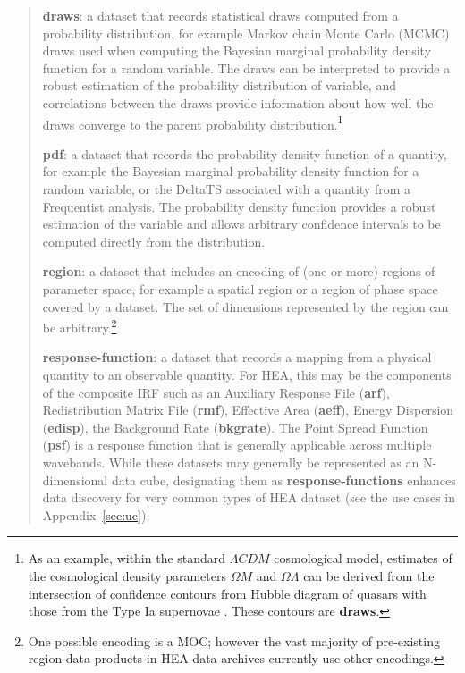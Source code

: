 \documentclass[11pt,a4paper]{ivoa}
\begin{document}
\begin{quote}
{\bf draws}: a dataset that records statistical draws computed from a probability distribution, for example Markov chain Monte Carlo (MCMC) draws used when computing the Bayesian marginal probability density function for a random variable. The draws can be interpreted to provide a robust estimation of the probability distribution of variable, and correlations between the draws provide information about how well the draws converge to the parent probability distribution.\footnote{As an example, within the standard $\Lambda CDM$ cosmological model, estimates of the cosmological density parameters $\Omega M$ and $\Omega\Lambda$ can be derived from the intersection of confidence contours from Hubble diagram of quasars with those from the Type Ia supernovae \citep{2019adds.book..283C}.  These contours are {\bf draws}.}

{\bf pdf}: a dataset that records the probability density function of a quantity, for example the Bayesian marginal probability density function for a random variable, or the DeltaTS associated with a quantity from a Frequentist analysis. The probability density function provides a robust estimation of the variable and allows arbitrary confidence intervals to be computed directly from the distribution.

{\bf region}: a dataset that includes an encoding of (one or more) regions of parameter space, for example a spatial region or a region of phase space covered by a dataset. The set of dimensions represented by the region can be arbitrary.\footnote{One possible encoding is a \gls{MOC}; however the vast majority of pre-existing region data products in \gls{HEA} data archives currently use other encodings.}

{\bf response-function}: a dataset that records a mapping from a physical quantity to an observable quantity. For \gls{HEA}, this may be the components of the composite \gls{IRF} such as an Auxiliary Response File ({\bf arf}), Redistribution Matrix File ({\bf rmf}), Effective Area ({\bf aeff}), Energy Dispersion ({\bf edisp}), the Background Rate ({\bf bkgrate}). The Point Spread Function ({\bf psf}) is a response function that is generally applicable across multiple wavebands. While these datasets may generally be represented as an N-dimensional data cube, designating them as {\bf response-functions} enhances data discovery for very common types of \gls{HEA} dataset (see the use cases in Appendix~\ref{sec:uc}).
\end{quote}
\end{document}
